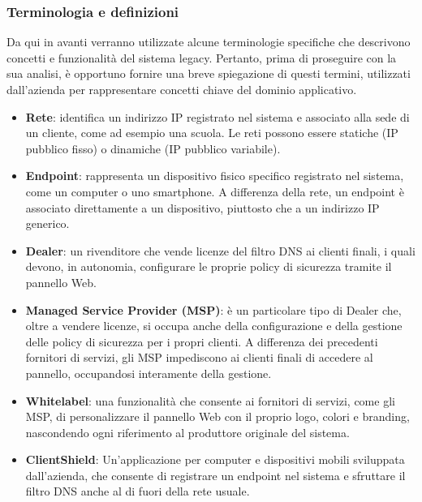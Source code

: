 \subsubsection{Terminologia e definizioni}
Da qui in avanti verranno utilizzate alcune terminologie specifiche che descrivono concetti e funzionalità del sistema legacy. Pertanto, prima di proseguire con la sua analisi, è opportuno fornire una breve spiegazione di questi termini, utilizzati dall'azienda per rappresentare concetti chiave del dominio applicativo.

\begin{itemize}
  \item \textbf{Rete}: identifica un indirizzo IP registrato nel sistema e associato alla sede di un cliente, come ad esempio una scuola. Le reti possono essere statiche (IP pubblico fisso) o dinamiche (IP pubblico variabile).

  \item \textbf{Endpoint}: rappresenta un dispositivo fisico specifico registrato nel sistema, come un computer o uno smartphone. A differenza della rete, un endpoint è associato direttamente a un dispositivo, piuttosto che a un indirizzo IP generico.

  \item \textbf{Dealer}: un rivenditore che vende licenze del filtro DNS ai clienti finali, i quali devono, in autonomia, configurare le proprie policy di sicurezza tramite il pannello Web.

  \item \textbf{Managed Service Provider (MSP)}: è un particolare tipo di Dealer che, oltre a vendere licenze, si occupa anche della configurazione e della gestione delle policy di sicurezza per i propri clienti. A differenza dei precedenti fornitori di servizi, gli MSP impediscono ai clienti finali di accedere al pannello, occupandosi interamente della gestione.

  \item \textbf{Whitelabel}: una funzionalità che consente ai fornitori di servizi, come gli MSP, di personalizzare il pannello Web con il proprio logo, colori e branding, nascondendo ogni riferimento al produttore originale del sistema.

  \item \textbf{ClientShield}: Un'applicazione per computer e dispositivi mobili sviluppata dall'azienda, che consente di registrare un endpoint nel sistema e sfruttare il filtro DNS anche al di fuori della rete usuale.
\end{itemize}

